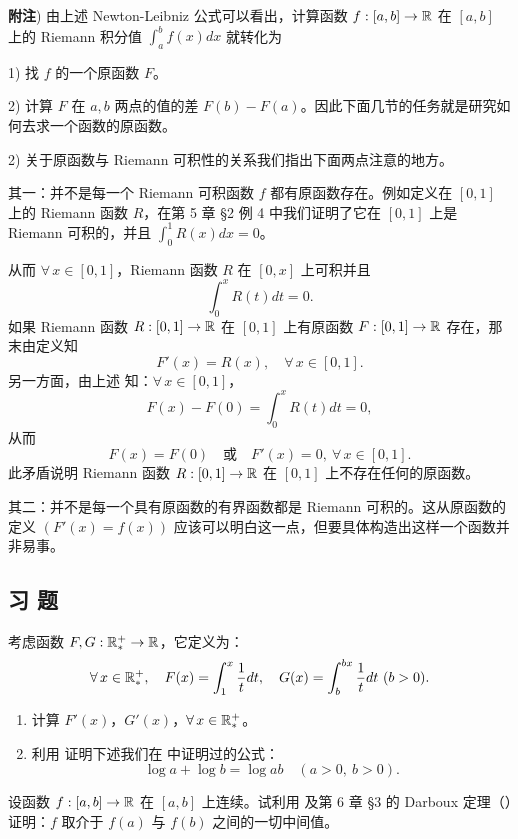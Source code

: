 \textbf{附注}) 由上述 Newton-Leibniz 公式可以看出，计算函数 \(f:[a,b]\to\mathbb{R}\) 在 \([a,b]\) 上的 Riemann 积分值 \(\displaystyle\int_a^b f(x)dx\) 就转化为

1) 找 \(f\) 的一个原函数 \(F\)。

2) 计算 \(F\) 在 \(a,b\) 两点的值的差 \(F(b)-F(a)\)。因此下面几节的任务就是研究如何去求一个函数的原函数。

2) 关于原函数与 Riemann 可积性的关系我们指出下面两点注意的地方。

其一：并不是每一个 Riemann 可积函数 \(f\) 都有原函数存在。例如定义在 \([0,1]\) 上的 Riemann 函数 \(R\)，在第 5 章 §2 例 4 中我们证明了它在 \([0,1]\) 上是 Riemann 可积的，并且 \(\displaystyle\int_0^1 R(x)dx=0\)。

从而 \(\forall\,x\in[0,1]\)，Riemann 函数 \(R\) 在 \([0,x]\) 上可积并且
\[
\int_0^x R(t)dt=0.
\]
如果 Riemann 函数 \(R:[0,1]\to\mathbb{R}\) 在 \([0,1]\) 上有原函数 \(F:[0,1]\to\mathbb{R}\) 存在，那末由定义知
\[
F'(x)=R(x),\quad\forall\,x\in[0,1].
\]
另一方面，由上述 知：\(\forall\,x\in[0,1]\)，
\[
F(x)-F(0)=\int_0^x R(t)dt=0,
\]
从而
\[
F(x)=F(0)\quad\text{或}\quad F'(x)=0,\ \forall\,x\in[0,1].
\]
此矛盾说明 Riemann 函数 \(R:[0,1]\to\mathbb{R}\) 在 \([0,1]\) 上不存在任何的原函数。

其二：并不是每一个具有原函数的有界函数都是 Riemann 可积的。这从原函数的定义 \((F'(x)=f(x))\) 应该可以明白这一点，但要具体构造出这样一个函数并非易事。

\subsection*{习 题}

\begin{exercise}
	\item 考虑函数 \(F,G:\mathbb{R}_*^+\to\mathbb{R}\)，它定义为：
	\[
	\forall\,x\in\mathbb{R}_*^+,\quad F(x)=\int_1^x\frac1t dt,\quad G(x)=\int_b^{bx}\frac1t dt\ (b>0).
	\]
	\begin{enumerate}[label=\arabic*)]
		\item 计算 \(F'(x)\)，\(G'(x)\)，\(\forall\,x\in\mathbb{R}_*^+\)。
		\item 利用 证明下述我们在 中证明过的公式：
		\[
		\log a+\log b=\log ab\quad(a>0,\ b>0).
		\]
	\end{enumerate}
\end{exercise}

\begin{exercise}
	\item 设函数 \(f:[a,b]\to\mathbb{R}\) 在 \([a,b]\) 上连续。试利用 及第 6 章 §3 的 Darboux 定理（）证明：\(f\) 取介于 \(f(a)\) 与 \(f(b)\) 之间的一切中间值。
\end{exercise}

